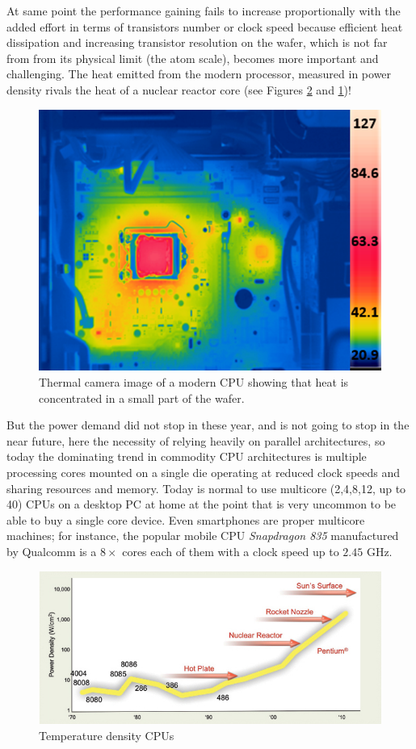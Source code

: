 At same point the performance gaining fails to increase proportionally with the added effort in terms of transistors number or clock speed because efficient heat dissipation and increasing transistor resolution on the wafer, which is not far from from its physical limit (the atom scale),  becomes more important and challenging.
The heat emitted from the modern processor, measured in power density rivals the heat of a nuclear reactor core (see Figures \ref{fig:tempCPU} and \ref{fig:tempCPU_thermal})!
\begin{figure}
	\centering
	\includegraphics[width=1.0\textwidth]{./images/parallel_programming/heat_cpu}
	\caption{Thermal camera image of a modern CPU showing that heat is concentrated in a small part of the wafer.}\label{fig:tempCPU_thermal}
\end{figure}
But the power demand did not stop in these year, and is not going to stop in the near future, here the necessity of relying heavily on parallel architectures, so today the dominating trend in commodity CPU architectures is multiple processing cores mounted on a single die operating at reduced clock speeds and sharing resources and memory. Today is normal to use multicore (2,4,8,12, up to 40) CPUs on a desktop PC at home at the point that is very uncommon to be able to buy a single core device.
Even smartphones are proper multicore machines; for instance, the popular mobile CPU \textit{Snapdragon 835} manufactured by Qualcomm is a $8 \times$ cores each of them with a clock speed up to $2.45$ GHz.
\begin{figure}
\centering
\includegraphics[width=1.0\textwidth]{./images/parallel_programming/temperatureCPU}
\caption{Temperature density CPUs}\label{fig:tempCPU}
\end{figure}
